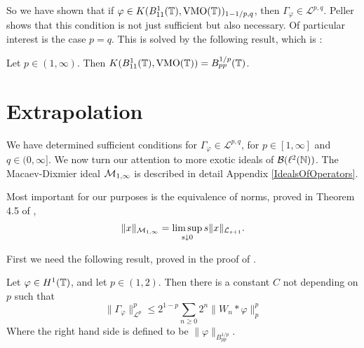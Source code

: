 


So we have shown that if $\varphi \in K(B_{11}^1(\mathbb{T}),\operatorname{VMO}(\mathbb{T}))_{1-1/p,q}$,
then $\Gamma_\varphi \in \mathcal{L}^{p,q}$. Peller \cite[Theorem 4.4, p. 256]{Peller2003} shows
that this condition is not just sufficient but also necessary. Of particular interest
is the case $p = q$. This is solved by the following result, which is \cite[Theorem 4.3, p.255]{Peller2003}:
\begin{proposition}
    Let $p \in (1,\infty)$. Then $K(B_{11}^1(\mathbb{T}),\operatorname{VMO}(\mathbb{T})) = B_{pp}^{1/p}(\mathbb{T})$. 
\end{proposition}

\section{Extrapolation}
We have determined sufficient conditions for $\Gamma_\varphi \in \mathcal{L}^{p,q}$,
for $p \in [1,\infty]$ and $q \in (0,\infty]$.
We now turn our attention to more exotic ideals of $\mathcal{B}(\ell^2(\mathbb{N}))$. The
Macaev-Dixmier ideal $\mathcal{M}_{1,\infty}$ is described in detail Appendix \ref{IdealsOfOperators}.

Most important for our purposes is the equivalence of norms, proved in Theorem 4.5 of \cite{CRSS},
\begin{equation}
    \|x\|_{\mathcal{M}_{1,\infty}} = \limsup_{s \downarrow 0} s\|x\|_{\mathcal{L}_{s+1}}.
\end{equation}

First we need the following result, proved in the proof of \cite[Theorem 3.1,p.250]{Peller2003}.
\begin{proposition}
    Let $\varphi \in H^1(\mathbb{T})$, and let $p \in (1,2)$. Then there is a constant $C$
    not depending on $p$ such that
    \begin{equation}
        \|\Gamma_{\varphi}\|_{\mathcal{L}^p}^p \leq 2^{1-p} \sum_{n\geq 0} 2^n\|W_n*\varphi\|_p^p
    \end{equation}
    Where the right hand side is defined to be $\|\varphi\|_{B_{pp}^{1/p}}$.
\end{proposition}

